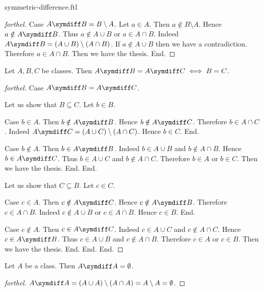\documentclass{naproche-library}
\begin{document}
\begin{smodule}{symmetric-difference.ftl}
\begin{proof}[forthel]
    Case $A \symdiff B = B \setminus A$.
      Let $a \in A$.
      Then $a \notin B \setminus A$.
      Hence $a \notin A \symdiff B$.
      Thus $a \notin A \cup B$ or $a \in A \cap B$.
      Indeed $A \symdiff B = (A \cup B) \setminus (A \cap B)$.
      If $a \notin A \cup B$ then we have a contradiction.
      Therefore $a \in A \cap B$.
      Then we have the thesis.
    End.
  \end{proof}

  \begin{proposition}[forthel,id=FOUNDATIONS_03_4490230937681920]
    Let $A, B, C$ be classes.
    Then $A \symdiff B = A \symdiff C \iff B = C$.
  \end{proposition}
  \begin{proof}[forthel]
    Case $A \symdiff B = A \symdiff C$.

      Let us show that $B \subseteq C$.
        Let $b \in B$.

        Case $b \in A$.
          Then $b \notin A \symdiff B$.
          Hence $b \notin A \symdiff C$.
          Therefore $b \in A \cap C$.
          Indeed $A \symdiff C = (A \cup C) \setminus (A \cap C)$.
          Hence $b \in C$.
        End.

        Case $b \notin A$.
          Then $b \in A \symdiff B$.
          Indeed $b \in A \cup B$ and $b \notin A \cap B$.
          Hence $b \in A \symdiff C$.
          Thus $b \in A \cup C$ and $b \notin A \cap C$.
          Therefore $b \in A$ or $b \in C$.
          Then we have the thesis.
        End.
      End.

      Let us show that $C \subseteq B$.
        Let $c \in C$.

        Case $c \in A$.
          Then $c \notin A \symdiff C$.
          Hence $c \notin A \symdiff B$.
          Therefore $c \in A \cap B$.
          Indeed $c \notin A \cup B$ or $c \in A \cap B$.
          Hence $c \in B$.
        End.

        Case $c \notin A$.
          Then $c \in A \symdiff C$.
          Indeed $c \in A \cup C$ and $c \notin A \cap C$.
          Hence $c \in A \symdiff B$.
          Thus $c \in A \cup B$ and $c \notin A \cap B$.
          Therefore $c \in A$ or $c \in B$.
          Then we have the thesis.
        End.
      End.
    End.
  \end{proof}

  \begin{proposition}[forthel,id=FOUNDATIONS_03_4578696040022016]
    Let $A$ be a class.
    Then $A \symdiff A = \emptyset$.
  \end{proposition}
  \begin{proof}[forthel]
    $A \symdiff A
      = (A \cup A) \setminus (A \cap A)
      = A \setminus A
      = \emptyset$.
  \end{proof}


\end{smodule}
\end{document}
